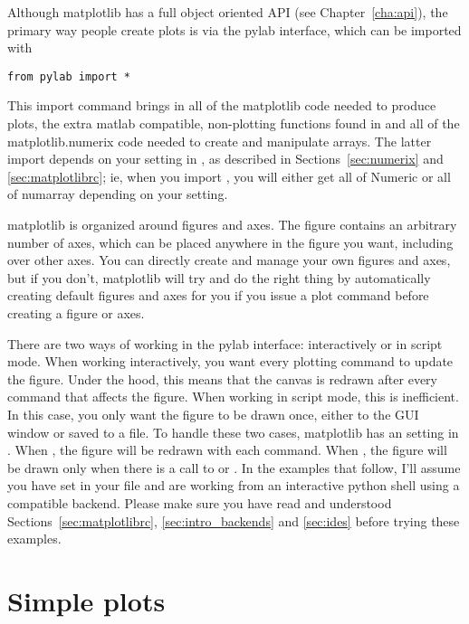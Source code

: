 \documentclass[twoside]{book}
\begin{document}
Although matplotlib has a full object oriented API (see
Chapter~\ref{cha:api}), the primary way people create plots is via the
pylab interface, which can be imported with

\begin{lstlisting}
from pylab import *
\end{lstlisting}

\noindent This import command brings in all of the matplotlib code
needed to produce plots, the extra matlab compatible, non-plotting
functions found in  and all of the
matplotlib.numerix code needed to create and manipulate arrays.  The
latter import depends on your  setting in
, as described in Sections~\ref{sec:numerix} and
\ref{sec:matplotlibrc}; ie, when you import
, you will either get all of Numeric or all
of numarray depending on your  setting.

matplotlib is organized around figures and axes.  The figure contains
an arbitrary number of axes, which can be placed anywhere in the
figure you want, including over other axes.  You can directly create
and manage your own figures and axes, but if you don't, matplotlib
will try and do the right thing by automatically creating default
figures and axes for you if you issue a plot command before creating a
figure or axes. 

There are two ways of working in the pylab interface: interactively or
in script mode.  When working interactively, you want every plotting
command to update the figure.  Under the hood, this means that the
canvas is redrawn after every command that affects the figure.  When
working in script mode, this is inefficient.  In this case, you only
want the figure to be drawn once, either to the GUI window or saved to
a file.  To handle these two cases, matplotlib has an 
setting in .  When , the
figure will be redrawn with each command.  When , the figure will be drawn only when there is a call to
 or .  In the examples that follow, I'll
assume you have set  in your
 file and are working from an interactive python
shell using a compatible backend.  Please make sure you have read and
understood Sections~\ref{sec:matplotlibrc}, \ref{sec:intro_backends}
and \ref{sec:ides} before trying these examples.

\section{Simple plots}
\label{sec:simple_plot}
\end{document}
